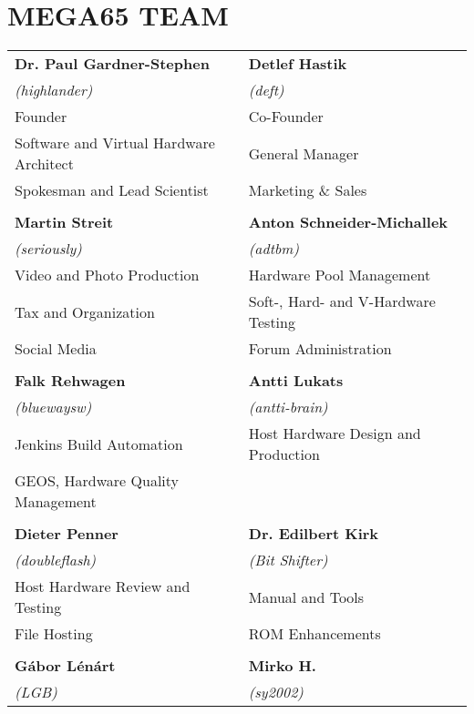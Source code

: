 \chapter*{MEGA65 TEAM}

\newpage
\setlength{\tabcolsep}{1mm}
\begin{tabular}{ll}

{\large\bf Dr. Paul Gardner-Stephen}    & {\large\bf Detlef Hastik} \\
\textit{(highlander)}                   & \textit{(deft)} \\
Founder                                 & Co-Founder \\
Software and Virtual Hardware Architect & General Manager \\
Spokesman and Lead Scientist            & Marketing \& Sales \\
& \\
{\large\bf Martin Streit}               & {\large\bf Anton Schneider-Michallek} \\
 \textit{(seriously)}                   & \textit{(adtbm)} \\
Video and Photo Production              & Hardware Pool Management \\
Tax and Organization                    & Soft-, Hard- and V-Hardware Testing \\
Social Media                            & Forum Administration \\
& \\
{\large\bf Falk Rehwagen}               & {\large\bf Antti Lukats} \\
 \textit{(bluewaysw)}                   & \textit{(antti-brain)} \\
Jenkins Build Automation                & Host Hardware Design and Production \\
GEOS, Hardware Quality Management       & \\
& \\
{\large\bf Dieter Penner}               & {\large\bf Dr. Edilbert Kirk} \\
 \textit{(doubleflash)}                 & \textit{(Bit Shifter)} \\
Host Hardware Review and Testing        & Manual and Tools \\
File Hosting                            & ROM Enhancements \\
& \\
{\large\bf Gábor Lénárt}                & {\large\bf Mirko H.} \\
 \textit{(LGB)}                         & \textit{(sy2002)} \\

\end{tabular}
